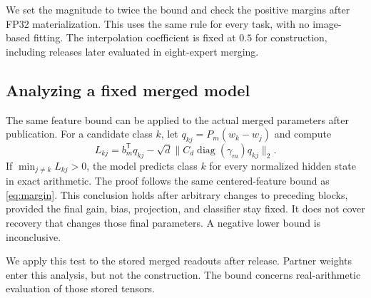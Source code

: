 We set the magnitude to twice the bound and check the positive margins after FP32 materialization. This uses the same rule for every task, with no image-based fitting. The interpolation coefficient is fixed at $0.5$ for construction, including releases later evaluated in eight-expert merging.

\subsection{Analyzing a fixed merged model}
The same feature bound can be applied to the actual merged parameters after publication. For a candidate class $k$, let $q_{kj}=P_m(w_k-w_j)$ and compute
\begin{equation}
 L_{kj}=b_m^{\mathsf T}q_{kj}
 -\sqrt d\|C_d\operatorname{diag}(\gamma_m)q_{kj}\|_2.
 \label{eq:actualbound}
\end{equation}
If $\min_{j\neq k}L_{kj}>0$, the model predicts class $k$ for every normalized hidden state in exact arithmetic. The proof follows the same centered-feature bound as \cref{eq:margin}. This conclusion holds after arbitrary changes to preceding blocks, provided the final gain, bias, projection, and classifier stay fixed. It does not cover recovery that changes those final parameters. A negative lower bound is inconclusive.

We apply this test to the stored merged readouts after release. Partner weights enter this analysis, but not the construction. The bound concerns real-arithmetic evaluation of those stored tensors.

